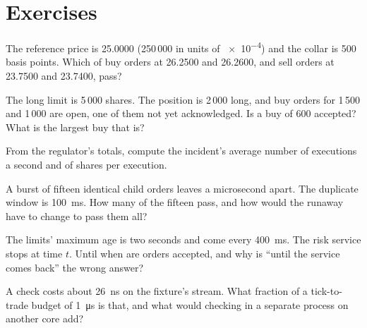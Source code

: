 \section{Exercises}

\begin{exercise}[$\star$]\label{exo:ll:pre-trade-risk-and-kill-switches:1}
The reference price is 25.0000 (250\,000 in units of \num{e-4}) and the collar is 500 basis points. Which of buy orders at
26.2500 and 26.2600, and sell orders at 23.7500 and 23.7400, pass?
\end{exercise}

\begin{exercise}[$\star$]\label{exo:ll:pre-trade-risk-and-kill-switches:2}
The long limit is 5\,000 shares. The position is 2\,000 long, and buy orders for 1\,500 and 1\,000 are open, one of them not
yet acknowledged. Is a buy of 600 accepted? What is the largest buy that is?
\end{exercise}

\begin{exercise}[$\star$]\label{exo:ll:pre-trade-risk-and-kill-switches:3}
From the regulator's totals, compute the incident's average number of executions a second and of shares per execution.
\end{exercise}

\begin{exercise}[$\star\star$]\label{exo:ll:pre-trade-risk-and-kill-switches:4}
A burst of fifteen identical child orders leaves a microsecond apart. The duplicate window is \qty{100}{\milli\second}. How
many of the fifteen pass, and how would the runaway have to change to pass them all?
\end{exercise}

\begin{exercise}[$\star\star$]\label{exo:ll:pre-trade-risk-and-kill-switches:5}
The limits' maximum age is two seconds and  come every \qty{400}{\milli\second}. The risk service stops at time
$t$. Until when are orders accepted, and why is ``until the service comes back'' the wrong answer?
\end{exercise}

\begin{exercise}[$\star\star$]\label{exo:ll:pre-trade-risk-and-kill-switches:6}
A check costs about \qty{26}{\nano\second} on the fixture's stream. What fraction of a tick-to-trade budget of
\qty{1}{\micro\second} is that, and what would checking in a separate process on another core add?
\end{exercise}

